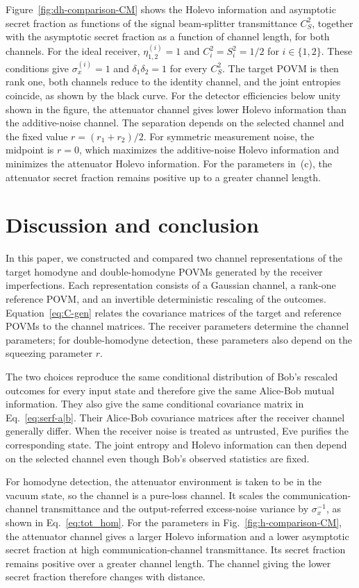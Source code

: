 \documentclass[%
final, 
superscriptaddress,
 amsmath,amssymb,amsfonts,
 aps,
 pra,
 longbibliography,
]{revtex4-2}
\begin{document}
Figure~\ref{fig:dh-comparison-CM} shows the Holevo information and asymptotic secret fraction as functions of the signal beam-splitter transmittance $C_S^2$, together with the asymptotic secret fraction as a function of channel length, for both channels. For the ideal receiver, $\eta_{1,2}^{(i)}=1$ and $C_i^2=S_i^2=1/2$ for $i\in\{1,2\}$. These conditions give $\sigma_x^{(i)}=1$ and $\delta_1\delta_2=1$ for every $C_S^2$. The target POVM is then rank one, both channels reduce to the identity channel, and the joint entropies coincide, as shown by the black curve. For the detector efficiencies below unity shown in the figure, the attenuator channel gives lower Holevo information than the additive-noise channel. The separation depends on the selected channel and the fixed value $r=(r_1+r_2)/2$. For symmetric measurement noise, the midpoint is $r=0$, which maximizes the additive-noise Holevo information and minimizes the attenuator Holevo information. For the parameters in~(c), the attenuator secret fraction remains positive up to a greater channel length.

\section{Discussion and conclusion}
\label{sec:conclusion}

In this paper, we constructed and compared two channel representations of the target homodyne and double-homodyne POVMs generated by the receiver imperfections. Each representation consists of a Gaussian channel, a rank-one reference POVM, and an invertible deterministic rescaling of the outcomes. Equation~\eqref{eq:C-gen} relates the covariance matrices of the target and reference POVMs to the channel matrices. The receiver parameters determine the channel parameters; for double-homodyne detection, these parameters also depend on the squeezing parameter $r$.

The two choices reproduce the same conditional distribution of Bob's rescaled outcomes for every input state and therefore give the same Alice-Bob mutual information. They also give the same conditional covariance matrix in Eq.~\eqref{eq:serf-a|b}. Their Alice-Bob covariance matrices after the receiver channel generally differ. When the receiver noise is treated as untrusted, Eve purifies the corresponding state. The joint entropy and Holevo information can then depend on the selected channel even though Bob's observed statistics are fixed.

For homodyne detection, the attenuator environment is taken to be in the vacuum state, so the channel is a pure-loss channel. It scales the communication-channel transmittance and the output-referred excess-noise variance by $\sigma_x^{-1}$, as shown in Eq.~\eqref{eq:tot_hom}. For the parameters in Fig.~\ref{fig:h-comparison-CM}, the attenuator channel gives a larger Holevo information and a lower asymptotic secret fraction at high communication-channel transmittance. Its secret fraction remains positive over a greater channel length. The channel giving the lower secret fraction therefore changes with distance.
\end{document}
